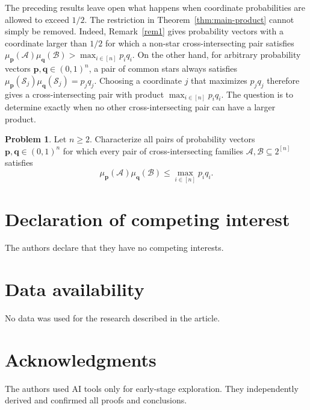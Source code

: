 \documentclass[11pt]{article}
\numberwithin{equation}{section}
\theoremstyle{definition}
\newtheorem{problem}[theorem]{Problem}
\theoremstyle{remark}
\begin{document}
The preceding results leave open what happens when coordinate
probabilities are allowed to exceed $1/2$. The restriction in
Theorem~\ref{thm:main-product} cannot simply be removed. Indeed,
Remark~\ref{rem1} gives probability vectors with a coordinate larger
than $1/2$ for which a non-star cross-intersecting pair satisfies
$
\mu_{\mathbf p}(\mathcal A)
\mu_{\mathbf q}(\mathcal B)
>
\max_{i\in[n]}p_iq_i.
$
On the other hand, for arbitrary probability vectors
$\mathbf p,\mathbf q\in(0,1)^n$, a pair of common stars always satisfies
$
\mu_{\mathbf p}(\mathcal S_j)
\mu_{\mathbf q}(\mathcal S_j)
=
p_jq_j.
$
Choosing a coordinate $j$ that maximizes $p_jq_j$ therefore gives a
cross-intersecting pair with product
$
\max_{i\in[n]}p_iq_i.
$
The question is to determine exactly when no other cross-intersecting
pair can have a larger product.

\begin{problem}
Let $n\geq2$. Characterize all pairs of probability vectors
$
\mathbf p,\mathbf q\in(0,1)^n
$
for which every pair of cross-intersecting families
$\mathcal A,\mathcal B\subseteq2^{[n]}$ satisfies
$$
\mu_{\mathbf p}(\mathcal A)
\mu_{\mathbf q}(\mathcal B)
\leq
\max_{i\in[n]}p_iq_i.
$$
\end{problem}


\section*{Declaration of competing interest}
The authors declare that they have no competing interests.

\section*{Data availability}
No data was used for the research described in the article.

\section*{Acknowledgments}
The authors used AI tools only for early-stage exploration. They independently derived and confirmed all proofs and conclusions.
\end{document}
